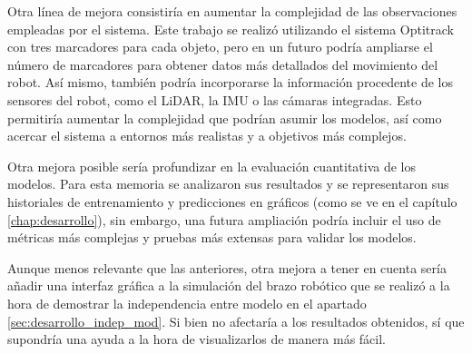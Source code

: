 Otra línea de mejora consistiría en aumentar la complejidad de las observaciones empleadas por el sistema. Este trabajo se realizó utilizando el sistema Optitrack con tres marcadores para cada 
objeto, pero en un futuro podría ampliarse el número de marcadores para obtener datos más detallados del movimiento del robot. Así mismo, también podría incorporarse la información procedente 
de los sensores del robot, como el LiDAR, la IMU o las cámaras integradas. Esto permitiría aumentar la complejidad que podrían asumir los modelos, así como acercar el sistema a entornos más 
realistas y a objetivos más complejos. 

Otra mejora posible sería profundizar en la evaluación cuantitativa de los modelos. Para esta memoria se analizaron sus resultados y se representaron sus historiales de entrenamiento y 
predicciones en gráficos (como se ve en el capítulo \ref{chap:desarrollo}), sin embargo, una futura ampliación podría incluir el uso de métricas más complejas y pruebas más extensas 
para validar los modelos. 

Aunque menos relevante que las anteriores, otra mejora a tener en cuenta sería añadir una interfaz gráfica a la simulación del brazo robótico que se realizó a la hora de demostrar la 
independencia entre modelo en el apartado \ref{sec:desarrollo_indep_mod}. Si bien no afectaría a los resultados obtenidos, sí que supondría una ayuda a la hora de 
visualizarlos de manera más fácil.

